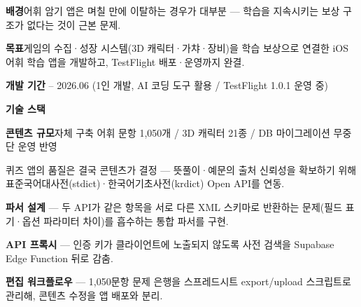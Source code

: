 

\begin{cvitems}
  \item {\textbf{배경}\enskip 어휘 암기 앱은 며칠 만에 이탈하는 경우가 대부분 --- 학습을 지속시키는 보상 구조가 없다는 것이 근본 문제.}
  \item {\textbf{목표}\enskip 게임의 수집·성장 시스템(3D 캐릭터·가챠·장비)을 학습 보상으로 연결한 iOS 어휘 학습 앱을 개발하고, TestFlight 배포·운영까지 완결.}
  \item {\textbf{개발 기간} -- 2026.06 (1인 개발, AI 코딩 도구 활용 / TestFlight 1.0.1 운영 중)}
  \item {\textbf{기술 스택}\enskip {}      }
  \item {\textbf{콘텐츠 규모}\enskip 자체 구축 어휘 문항 1,050개 / 3D 캐릭터 21종 / DB 마이그레이션 무중단 운영 반영}
\end{cvitems}


\newpage
{}

\begin{substeps}
  \item 퀴즈 앱의 품질은 결국 콘텐츠가 결정 --- 뜻풀이·예문의 출처 신뢰성을 확보하기 위해 표준국어대사전(stdict)·한국어기초사전(krdict) Open API를 연동.
  \item \textbf{파서 설계} --- 두 API가 같은 항목을 서로 다른 XML 스키마로 반환하는 문제(필드 표기·옵션 파라미터 차이)를 흡수하는 통합 파서를 구현.
  \item \textbf{API 프록시} --- 인증 키가 클라이언트에 노출되지 않도록 사전 검색을 Supabase Edge Function 뒤로 감춤.
  \item \textbf{편집 워크플로우} --- 1,050문항 문제 은행을 스프레드시트 export/upload 스크립트로 관리해, 콘텐츠 수정을 앱 배포와 분리.
\end{substeps}

